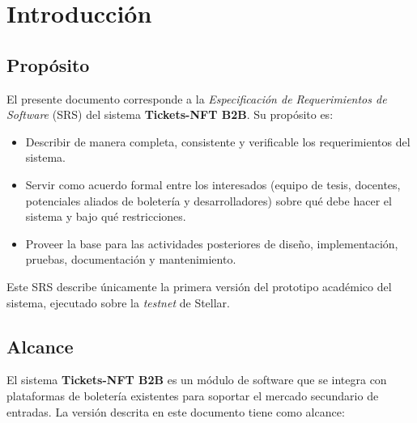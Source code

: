 \documentclass[12pt,letterpaper]{article}
\begin{document}
\newpage

\tableofcontents
\newpage

\listoftables
\newpage

\listoffigures
\newpage

\section{Introducción}

\subsection{Propósito}

El presente documento corresponde a la \textit{Especificación de Requerimientos
de Software} (SRS) del sistema \textbf{Tickets-NFT B2B}. Su propósito es:

\begin{itemize}
    \item Describir de manera completa, consistente y verificable los
          requerimientos del sistema.
    \item Servir como acuerdo formal entre los interesados (equipo de tesis,
          docentes, potenciales aliados de boletería y desarrolladores) sobre
          qué debe hacer el sistema y bajo qué restricciones.
    \item Proveer la base para las actividades posteriores de diseño,
          implementación, pruebas, documentación y mantenimiento.
\end{itemize}

Este SRS describe únicamente la primera versión del prototipo académico del
sistema, ejecutado sobre la \textit{testnet} de Stellar.

\subsection{Alcance}

El sistema \textbf{Tickets-NFT B2B} es un módulo de software que se integra con
plataformas de boletería existentes para soportar el mercado secundario de
entradas. La versión descrita en este documento tiene como alcance:
\end{document}
